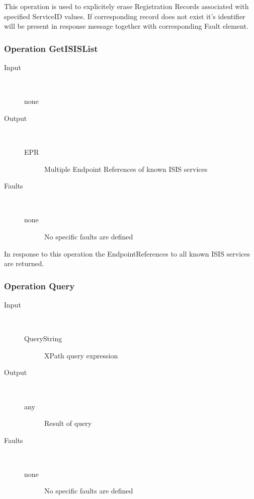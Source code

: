 \documentclass{book}
\begin{document}
This operation is used to explicitely erase Registration Records associated with specified ServiceID values. If corresponding record does not exist it's identifier will be present in response message together with corresponding Fault element.

\subsubsection{Operation GetISISList}

\begin{description}

  \item[Input]~\begin{description}
    \item[none]
  \end{description}

  \item[Output]~\begin{description}
    \item[EPR] Multiple Endpoint References of known ISIS services
  \end{description}

  \item[Faults]~\begin{description}
    \item[none]No specific faults are defined
  \end{description}

\end{description}

In response to this operation the EndpointReferences to all known ISIS services are returned.

\subsubsection{Operation Query}

\begin{description}

  \item[Input]~\begin{description}
    \item[QueryString] XPath query expression
  \end{description}

  \item[Output]~\begin{description}
    \item[any] Result of query
  \end{description}

  \item[Faults]~\begin{description}
    \item[none]No specific faults are defined
  \end{description}

\end{description}
\end{document}
